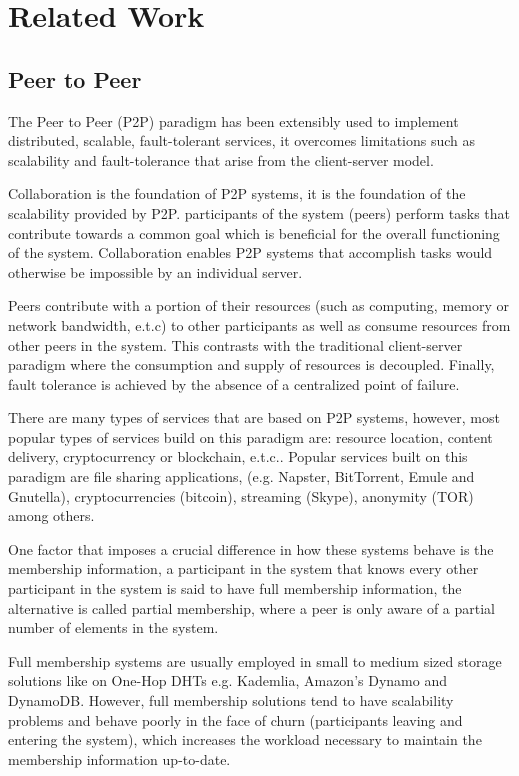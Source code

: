 \chapter{Related Work}
\label{cha:related_work}


\section{Peer to Peer} %
\label{sec:p2p}

The Peer to Peer (P2P) paradigm has been extensibly used to implement distributed, scalable, fault-tolerant services, it overcomes limitations such as scalability and fault-tolerance that arise from the client-server model. 

Collaboration is the foundation of P2P systems, it is the foundation of the scalability provided by P2P. participants of the system (peers) perform tasks that contribute towards a common goal which is beneficial for the overall functioning of the system. Collaboration enables P2P systems that accomplish tasks would otherwise be impossible by an individual server.  %

Peers contribute with a portion of their resources (such as computing, memory or network bandwidth, e.t.c) to other participants as well as consume resources from other peers in the system. This contrasts with the traditional client-server paradigm where the consumption and supply of resources is decoupled. Finally, fault tolerance is achieved by the absence of a centralized point of failure.

There are many types of services that are based on P2P systems, however, most popular types of services build on this paradigm are: resource location, content delivery, cryptocurrency or blockchain, e.t.c.. Popular services built on this paradigm are file sharing applications, (e.g. Napster, BitTorrent, Emule and Gnutella), cryptocurrencies (bitcoin), streaming (Skype), anonymity (TOR) among others. 

One factor that imposes a crucial difference in how these systems behave is the membership information, a participant in the system that knows every other participant in the system is said to have full membership information, the alternative is called partial membership, where a peer is only aware of a partial number of elements in the system.

Full membership systems are usually employed in small to medium sized storage solutions like on One-Hop DHTs e.g. Kademlia, Amazon's Dynamo and DynamoDB. However, full membership solutions tend to have scalability problems and behave poorly in the face of churn (participants leaving and entering the system), which increases the workload necessary to maintain the membership information up-to-date. 

